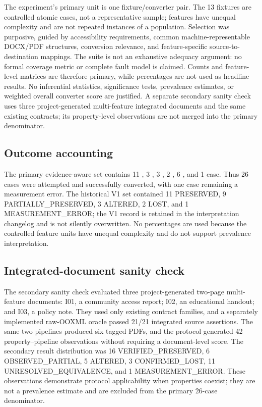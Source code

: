 The experiment's primary unit is one fixture/converter pair. The 13 fixtures are controlled atomic cases, not a representative sample; features have unequal complexity and are not repeated instances of a population. Selection was purposive, guided by accessibility requirements, common machine-representable DOCX/PDF structures, conversion relevance, and feature-specific source-to-destination mappings. The suite is not an exhaustive adequacy argument: no formal coverage metric or complete fault model is claimed. Counts and feature-level matrices are therefore primary, while percentages are not used as headline results. No inferential statistics, significance tests, prevalence estimates, or weighted overall converter score are justified. A separate secondary sanity check uses three project-generated multi-feature integrated documents and the same existing contracts; its property-level observations are not merged into the primary denominator.

\subsection{Outcome accounting}

The primary evidence-aware set contains 11 \verifiedpreserved{}, 3 \observedpartial{}, 3 \altered{}, 2 \confirmedlost{}, 6 \unresolved{}, and 1 \measured{} case. Thus 26 cases were attempted and successfully converted, with one case remaining a measurement error. The historical V1 set contained 11 PRESERVED, 9 PARTIALLY\_PRESERVED, 3 ALTERED, 2 LOST, and 1 MEASUREMENT\_ERROR; the V1 record is retained in the interpretation changelog and is not silently overwritten. No percentages are used because the controlled feature units have unequal complexity and do not support prevalence interpretation.

\subsection{Integrated-document sanity check}

The secondary sanity check evaluated three project-generated two-page multi-feature documents: I01, a community access report; I02, an educational handout; and I03, a policy note. They used only existing contract families, and a separately implemented raw-OOXML oracle passed 21/21 integrated source assertions. The same two pipelines produced six tagged PDFs, and the protocol generated 42 property--pipeline observations without requiring a document-level score. The secondary result distribution was 16 VERIFIED\_PRESERVED, 6 OBSERVED\_PARTIAL, 5 ALTERED, 3 CONFIRMED\_LOST, 11 UNRESOLVED\_EQUIVALENCE, and 1 MEASUREMENT\_ERROR. These observations demonstrate protocol applicability when properties coexist; they are not a prevalence estimate and are excluded from the primary 26-case denominator.


